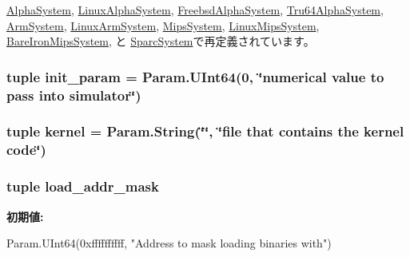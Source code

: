 \hyperlink{classAlphaSystem_1_1AlphaSystem_a17da7064bc5c518791f0c891eff05fda}{AlphaSystem}, \hyperlink{classAlphaSystem_1_1LinuxAlphaSystem_a17da7064bc5c518791f0c891eff05fda}{LinuxAlphaSystem}, \hyperlink{classAlphaSystem_1_1FreebsdAlphaSystem_a17da7064bc5c518791f0c891eff05fda}{FreebsdAlphaSystem}, \hyperlink{classAlphaSystem_1_1Tru64AlphaSystem_a17da7064bc5c518791f0c891eff05fda}{Tru64AlphaSystem}, \hyperlink{classArmSystem_1_1ArmSystem_a17da7064bc5c518791f0c891eff05fda}{ArmSystem}, \hyperlink{classArmSystem_1_1LinuxArmSystem_a17da7064bc5c518791f0c891eff05fda}{LinuxArmSystem}, \hyperlink{classMipsSystem_1_1MipsSystem_a17da7064bc5c518791f0c891eff05fda}{MipsSystem}, \hyperlink{classMipsSystem_1_1LinuxMipsSystem_a17da7064bc5c518791f0c891eff05fda}{LinuxMipsSystem}, \hyperlink{classMipsSystem_1_1BareIronMipsSystem_a17da7064bc5c518791f0c891eff05fda}{BareIronMipsSystem}, と \hyperlink{classSparcSystem_1_1SparcSystem_a17da7064bc5c518791f0c891eff05fda}{SparcSystem}で再定義されています。\hypertarget{classSystem_1_1System_a8f33794b9902debe332c255a67ee4118}{
\subsubsection[{init\_\-param}]{\setlength{\rightskip}{0pt plus 5cm}tuple {\bf init\_\-param} = Param.UInt64(0, \char`\"{}numerical value to pass into simulator\char`\"{})}}
\label{classSystem_1_1System_a8f33794b9902debe332c255a67ee4118}
\hypertarget{classSystem_1_1System_af88c6d996d5a7fc68d6f57bb1959c4cc}{
\subsubsection[{kernel}]{\setlength{\rightskip}{0pt plus 5cm}tuple {\bf kernel} = Param.String(\char`\"{}\char`\"{}, \char`\"{}file that contains the {\bf kernel} code\char`\"{})}}
\label{classSystem_1_1System_af88c6d996d5a7fc68d6f57bb1959c4cc}
\hypertarget{classSystem_1_1System_ae97427a4073448718c4d7c3df3b53143}{
\subsubsection[{load\_\-addr\_\-mask}]{\setlength{\rightskip}{0pt plus 5cm}tuple {\bf load\_\-addr\_\-mask}}}
\label{classSystem_1_1System_ae97427a4073448718c4d7c3df3b53143}
{\bfseries 初期値:}
\begin{DoxyCode}
Param.UInt64(0xffffffffff,
            "Address to mask loading binaries with")
\end{DoxyCode}


